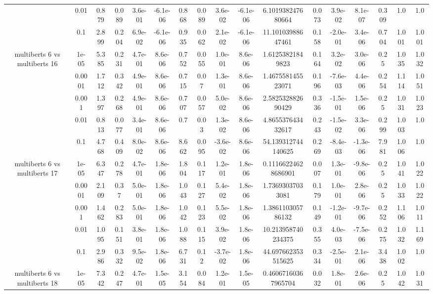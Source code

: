 \begin{tabular}{|c|c|c|c|c|c|c|c|c|c|c|c|c|c|c|c|c|}
 & 0.01 & 0.879 & 0.089 & 3.6e-01 & -6.1e-06 & 0.868 & 0.089 & 3.6e-02 & -6.1e-06 & 6.101938247680664 & 0.073 & 3.9e-02 & 8.1e-07 & 0.309 & 1.0 & 1.0 \\
 & 0.1 & 2.899 & 0.204 & 6.9e-02 & -6.1e-06 & 0.935 & 0.062 & 2.1e-02 & -6.1e-06 & 11.10103988647461 & 0.158 & -2.0e-01 & 3.4e-06 & 0.704 & 1.001 & 1.001 \\
\hline
\multirow{5}{*}{multiberts 6 vs multiberts 16} & 1e-05 & 5.385 & 0.231 & 4.7e-01 & 8.6e-06 & 0.752 & 0.055 & 1.0e-01 & 8.6e-06 & 1.61253821849823 & 0.164 & 3.2e-02 & 3.0e-06 & 0.25 & 1.035 & 1.032 \\
 & 0.0001 & 1.712 & 0.342 & 4.9e-01 & 8.6e-06 & 0.715 & 0.07 & 1.3e-01 & 8.6e-06 & 1.467558145523071 & 0.196 & -7.6e-03 & 4.4e-06 & 0.254 & 1.114 & 1.051 \\
 & 0.001 & 1.397 & 0.268 & 4.9e-01 & 8.6e-06 & 0.707 & 0.057 & 5.0e-02 & 8.6e-06 & 2.582532882690429 & 0.336 & -1.5e-01 & 1.5e-06 & 0.25 & 1.031 & 1.023 \\
 & 0.01 & 0.813 & 0.077 & 3.4e-01 & 8.6e-06 & 0.7 & 0.03 & 1.3e-02 & 8.6e-06 & 4.865537643432617 & 0.243 & -1.5e-02 & 3.3e-06 & 0.299 & 1.003 & 1.0 \\
 & 0.1 & 4.768 & 0.409 & 8.0e-02 & 8.6e-06 & 8.662 & 0.095 & -3.6e-02 & 8.6e-06 & 54.139312744140625 & 0.269 & -8.4e-03 & -1.3e-06 & 7.981 & 1.006 & 1.0 \\
\hline
\multirow{5}{*}{multiberts 6 vs multiberts 17} & 1e-05 & 6.347 & 0.278 & 4.7e-01 & 1.8e-06 & 1.804 & 0.117 & 1.2e-01 & 1.8e-06 & 0.11166224628686901 & 0.007 & 1.3e-01 & -9.8e-06 & 0.25 & 1.041 & 1.022 \\
 & 0.0001 & 2.109 & 0.37 & 5.0e-01 & 1.8e-06 & 1.043 & 0.127 & 5.4e-02 & 1.8e-06 & 1.73693037033081 & 0.179 & 1.0e-01 & 2.8e-06 & 0.25 & 1.033 & 1.022 \\
 & 0.001 & 1.462 & 0.283 & 5.0e-01 & 1.8e-06 & 1.042 & 0.123 & 5.5e-02 & 1.8e-06 & 1.386110305786132 & 0.149 & -1.2e-01 & -9.7e-06 & 0.252 & 1.106 & 1.011 \\
 & 0.01 & 1.095 & 0.151 & 3.8e-01 & 1.8e-06 & 1.088 & 0.115 & 3.9e-02 & 1.8e-06 & 10.213958740234375 & 0.355 & 4.0e-03 & -7.5e-06 & 0.275 & 1.032 & 1.169 \\
 & 0.1 & 2.986 & 0.332 & 9.5e-02 & 1.8e-06 & 6.731 & 0.12 & -3.7e-02 & 1.8e-06 & 44.697662353515625 & 0.334 & -2.5e-01 & 2.1e-06 & 3.438 & 1.002 & 1.0 \\
\hline
\multirow{5}{*}{multiberts 6 vs multiberts 18} & 1e-05 & 7.342 & 0.247 & 4.7e-01 & 1.5e-05 & 3.154 & 0.084 & 1.2e-01 & 1.5e-05 & 0.46067160367965704 & 0.032 & 1.8e-01 & 2.6e-06 & 0.25 & 1.042 & 1.031 \\

\end{tabular}
